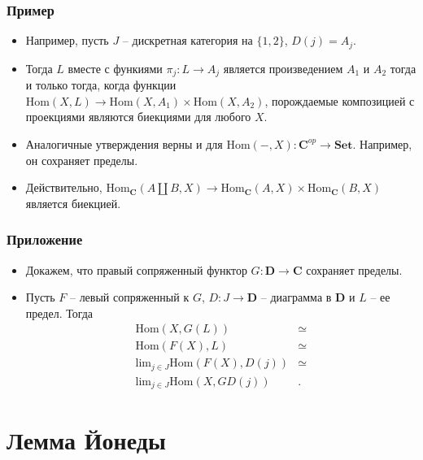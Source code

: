 \documentclass{beamer}
\theoremstyle{definition}
\newcommand{\cat}[1]{\mathbf{#1}}
\renewcommand{\C}{\cat{C}}
\newcommand{\D}{\cat{D}}
\newcommand{\Set}{\cat{Set}}
\newcommand{\Hom}{\mathrm{Hom}}
\newcommand{\limit}{\mathrm{lim}}
\begin{document}
\begin{frame}
\frametitle{Пример}
\begin{itemize}
\item Например, пусть $J$ -- дискретная категория на $\{ 1, 2 \}$, $D(j) = A_j$.
\item Тогда $L$ вместе с функиями $\pi_j : L \to A_j$ является произведением $A_1$ и $A_2$ тогда и только тогда, когда функции $\Hom(X,L) \to \Hom(X,A_1) \times \Hom(X,A_2)$,
порождаемые композицией с проекциями являются биекциями для любого $X$.
\item Аналогичные утверждения верны и для $\Hom(-, X) : \C^{op} \to \Set$. Например, он сохраняет пределы.
\item Действительно, $\Hom_\C(A \amalg B, X) \to \Hom_\C(A,X) \times \Hom_\C(B,X)$ является биекцией.
\end{itemize}
\end{frame}

\begin{frame}
\frametitle{Приложение}
\begin{itemize}
\item Докажем, что правый сопряженный функтор $G : \D \to \C$ сохраняет пределы.
\item Пусть $F$ -- левый сопряженный к $G$, $D : J \to \D$ -- диаграмма в $\D$ и $L$ -- ее предел. Тогда
\begin{align*}
\Hom(X,G(L)) & \simeq \\
\Hom(F(X),L) & \simeq \\
\limit_{j \in J} \Hom(F(X), D(j)) & \simeq \\
\limit_{j \in J} \Hom(X, GD(j)) & .
\end{align*}
\end{itemize}
\end{frame}

\section{Лемма Йонеды}
\end{document}
